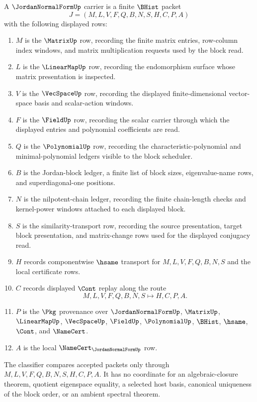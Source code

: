 \begin{definition}
\label{def:jordan-normal-form-carrier}
A $\JordanNormalFormUp$ carrier is a finite $\BHist$ packet
$$
J=(M,L,V,F,Q,B,N,S,H,C,P,A)
$$
with the following displayed rows:
\begin{enumerate}
\item $M$ is the $\MatrixUp$ row, recording the finite matrix entries, row-column index windows, and matrix multiplication requests used by the block read.
\item $L$ is the $\LinearMapUp$ row, recording the endomorphism surface whose matrix presentation is inspected.
\item $V$ is the $\VecSpaceUp$ row, recording the displayed finite-dimensional vector-space basis and scalar-action windows.
\item $F$ is the $\FieldUp$ row, recording the scalar carrier through which the displayed entries and polynomial coefficients are read.
\item $Q$ is the $\PolynomialUp$ row, recording the characteristic-polynomial and minimal-polynomial ledgers visible to the block scheduler.
\item $B$ is the Jordan-block ledger, a finite list of block sizes, eigenvalue-name rows, and superdiagonal-one positions.
\item $N$ is the nilpotent-chain ledger, recording the finite chain-length checks and kernel-power windows attached to each displayed block.
\item $S$ is the similarity-transport row, recording the source presentation, target block presentation, and matrix-change rows used for the displayed conjugacy read.
\item $H$ records componentwise $\hsame$ transport for $M,L,V,F,Q,B,N,S$ and the local certificate rows.
\item $C$ records displayed $\Cont$ replay along the route
$$
M,L,V,F,Q,B,N,S \longmapsto H,C,P,A .
$$
\item $P$ is the $\Pkg$ provenance over $\JordanNormalFormUp$, $\MatrixUp$, $\LinearMapUp$, $\VecSpaceUp$, $\FieldUp$, $\PolynomialUp$, $\BHist$, $\hsame$, $\Cont$, and $\NameCert$.
\item $A$ is the local $\NameCert_{\JordanNormalFormUp}$ row.
\end{enumerate}
The classifier compares accepted packets only through $M,L,V,F,Q,B,N,S,H,C,P,A$. It has no coordinate for an algebraic-closure theorem, quotient eigenspace equality, a selected host basis, canonical uniqueness of the block order, or an ambient spectral theorem.
\end{definition}

